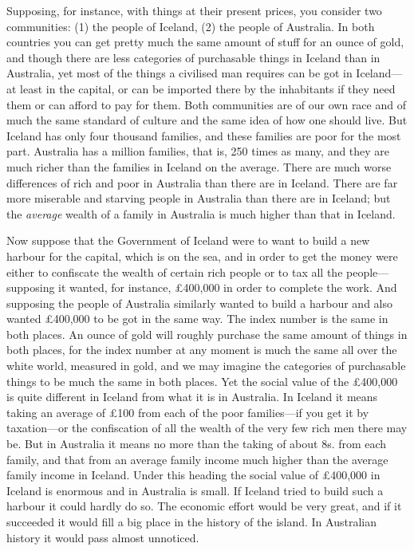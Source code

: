 \documentclass{book}
\begin{document}
Supposing, for instance, with things at their present prices, you consider two communities: (1) the people of Iceland, (2) the people of Australia. In both countries you can get pretty much the same amount of stuff for an ounce of gold, and though there are less categories of purchasable things in Iceland than in Australia, yet most of the things a civilised man requires can be got in Iceland—at least in the capital, or can be imported there by the inhabitants if they need them or can afford to pay for them. Both communities are of our own race and of much the same standard of culture and the same idea of how one should live. But Iceland has only four thousand families, and these families are poor for the most part. Australia has a million families, that is, 250 times as many, and they are much richer than the families in Iceland on the average. There are much worse differences of rich and poor in Australia than there are in Iceland. There are far more miserable and starving people in Australia than there are in Iceland; but the \emph{average} wealth of a family in Australia is much higher than that in Iceland.

Now suppose that the Government of Iceland were to want to build a new harbour for the capital, which is on the sea, and in order to get the money were either to confiscate the wealth of certain rich people or to tax all the people—supposing it wanted, for instance, £400,000 in order to complete the work. And supposing the people of Australia similarly wanted to build a harbour and also wanted £400,000 to be got in the same way. The index number is the same in both places. An ounce of gold will roughly purchase the same amount of things in both places, for the index number at any moment is much the same all over the white world, measured in gold, and we may imagine the categories of purchasable things to be much the same in both places. Yet the social value of the £400,000 is quite different in Iceland from what it is in Australia. In Iceland it means taking an average of £100 from each of the poor families—if you get it by taxation—or the confiscation of all the wealth of the very few rich men there may be. But in Australia it means no more than the taking of about 8s. from each family, and that from an average family income much higher than the average family income in Iceland. Under this heading the social value of £400,000 in Iceland is enormous and in Australia is small. If Iceland tried to build such a harbour it could hardly do so. The economic effort would be very great, and if it succeeded it would fill a big place in the history of the island. In Australian history it would pass almost unnoticed.
\end{document}
